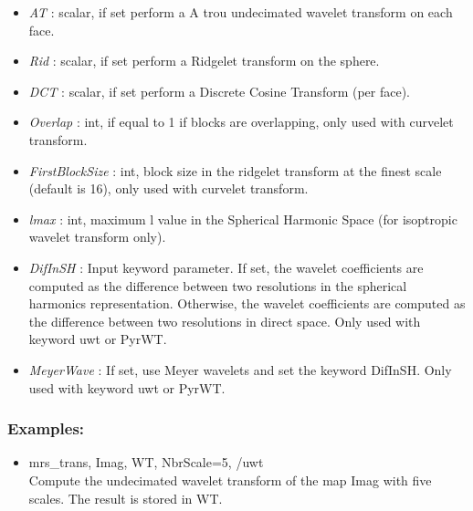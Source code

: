 \begin{itemize}
\item {\em AT} : scalar, if set perform a A trou undecimated wavelet transform on each face.
\item {\em Rid} : scalar, if set perform a Ridgelet transform on the sphere.
\item {\em DCT} : scalar, if set perform a Discrete Cosine Transform (per face).
\item {\em Overlap} : int, if equal to 1 if blocks are overlapping, only used with curvelet transform.
\item {\em FirstBlockSize} : int, block size in the ridgelet transform at the finest scale (default is 16), only used with curvelet transform.
\item {\em lmax} : int, maximum l value in the Spherical Harmonic Space (for isoptropic wavelet transform only).
\item {\em DifInSH} : Input keyword parameter. If set, the wavelet coefficients are computed as the difference between two resolutions in the spherical harmonics representation. 
Otherwise, the wavelet coefficients are computed as the difference between two resolutions in direct space. Only used with keyword uwt or PyrWT.
\item {\em MeyerWave} : If set, use Meyer wavelets and set the keyword DifInSH. Only used with keyword uwt or PyrWT.
\end{itemize}

\subsubsection*{Examples:} 
\begin{itemize}
\item mrs\_trans, Imag, WT, NbrScale=5, /uwt \\
Compute the undecimated wavelet transform of the map Imag with five scales. The result is stored in WT.
\end{itemize}



